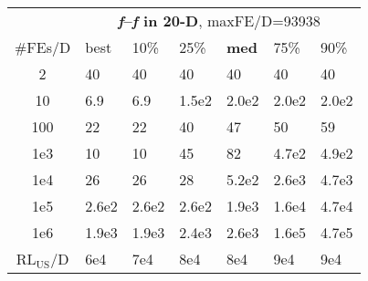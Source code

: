 \begin{tabular}{c|llllll}
 & \multicolumn{6}{|c}{\textbf{\textit{f}\raisebox{-0.35ex}{1}--\textit{f}\raisebox{-0.35ex}{5} in 20-D}, maxFE/D=93938}\\
\#FEs/D & best & 10\% & 25\% & \textbf{med} & 75\% & 90\%\\
2 & 40 & 40 & 40 & 40 & 40 & 40\\
10 & \hspace*{1ex}6.9 & \hspace*{1ex}6.9 & 1.5e2 & 2.0e2 & 2.0e2 & 2.0e2\\
100 & 22 & 22 & 40 & 47 & 50 & 59\\
1e3 & 10 & 10 & 45 & 82 & 4.7e2 & 4.9e2\\
1e4 & 26 & 26 & 28 & 5.2e2 & 2.6e3 & 4.7e3\\
1e5 & 2.6e2 & 2.6e2 & 2.6e2 & 1.9e3 & 1.6e4 & 4.7e4\\
1e6 & 1.9e3 & 1.9e3 & 2.4e3 & 2.6e3 & 1.6e5 & 4.7e5\\
$\text{RL}_{\text{US}}$/D & 6e4 & 7e4 & 8e4 & 8e4 & 9e4 & 9e4
\end{tabular}
